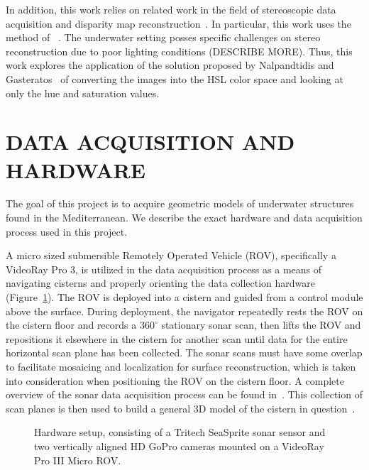 \documentclass[a4paper,twoside]{article}
\begin{document}
In addition, this work relies on related work in the field of stereoscopic data acquisition and disparity map reconstruction~\cite{}.  In particular, this work uses the method of ~\cite{stereo:zitKan}.  The underwater setting posses specific challenges on stereo reconstruction due to poor lighting conditions (DESCRIBE MORE).  Thus, this work explores the application of the solution proposed by Nalpandtidis and Gasteratos~\cite{stereo:nalpantidis2010stereo}  of  converting the images into the HSL color space and looking at only the hue and saturation values. 


\section{\uppercase{Data Acquisition and Hardware}}
\label{sec:data}

\noindent The goal of this project is to acquire geometric models of underwater structures found in the Mediterranean.  We describe the exact hardware and data acquisition process used in this project.

A micro sized submersible Remotely Operated Vehicle (ROV), specifically a VideoRay Pro 3, is utilized in the data acquisition process as a means of navigating cisterns and properly orienting the data collection hardware (Figure~\ref{fig:ROV}). The ROV is deployed into a cistern and guided from a control module above the surface. During deployment, the navigator repeatedly rests the ROV on the cistern floor and records a $360^{\circ}$ stationary sonar scan, then lifts the ROV and repositions it elsewhere in the cistern for another scan until data for the entire horizontal scan plane has been collected. The sonar scans must have some overlap to facilitate mosaicing and localization for surface reconstruction, which is taken into consideration when positioning the ROV on the cistern floor. A complete overview of the sonar data acquisition process can be found in~\cite{ClarkVast}.  This collection of scan planes is then used to build a general 3D model of the cistern in question~\cite{ICEX11}.
  
\begin{figure}[!h]
   \vspace{-0.2cm}
   \caption{Hardware setup, consisting of a Tritech SeaSprite sonar sensor and two vertically aligned HD GoPro cameras mounted on a VideoRay Pro III Micro ROV.}
  \label{fig:ROV}
 \end{figure}
\end{document}
